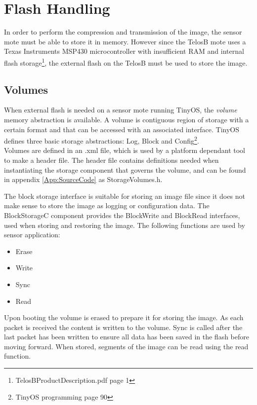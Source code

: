 \section{Flash Handling}

In order to perform the compression and transmission of the image, the sensor mote must be able to store it in memory. However since the TelosB mote uses a Texas Instruments  MSP430 microcontroller with insufficient RAM and internal flash storage\footnote{TelosBProductDescription.pdf\cite{telosbProductDesc} page 1}, the external flash on the TelosB must be used to store the image.

\subsection{Volumes}
When external flash is needed on a sensor mote running TinyOS, the \emph{volume} memory abstraction is available. A volume is contiguous region of storage with a certain format and that can be accessed with an associated interface. TinyOS defines three basic storage abstractions: Log, Block and Config\footnote{TinyOS programming\cite{tinyOSprog} page 90}.
\\Volumes are defined in an .xml file, which is used by a platform dependant tool to make a header file. The header file contains definitions needed when instantiating the storage component that governs the volume, and can be found in appendix \ref{App:SourceCode} as StorageVolumes.h.   

The block storage interface is suitable for storing an image file since it does not make sense to store the image as logging or configuration data. The BlockStorageC component provides the BlockWrite and BlockRead interfaces, used when storing and restoring the image. The following functions are used by sensor application:

\begin{itemize}
\item Erase
\item Write
\item Sync
\item Read
\end{itemize}  

Upon booting the volume is erased to prepare it for storing the image. As each packet is received the content is written to the volume. Sync is called after the last packet has been written to ensure all data has been saved in the flash before moving forward. When stored, segments of the image can be read using the read function.






 

   